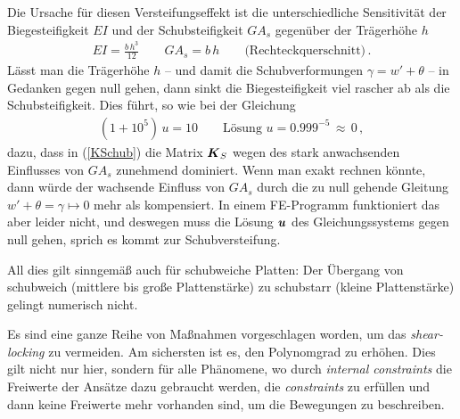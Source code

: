 {Die Ursache f\"{u}r diesen Versteifungseffekt ist die unterschiedliche Sensitivit\"{a}t der Biegesteifigkeit $EI$ und der Schubsteifigkeit $GA_s$ gegen\"{u}ber der Tr\"{a}gerh\"{o}he $h$
\begin{align}
E I = \frac{b\,h^3}{12} \qquad G A_s = b \, h   \qquad \mbox{(Rechteckquerschnitt)} \,.
\end{align}
L\"{a}sst man die Tr\"{a}gerh\"{o}he $h$ -- und damit die Schubverformungen $\gamma = w' + \theta$ -- in Gedanken gegen null gehen, dann sinkt die Biegesteifigkeit viel rascher ab als die Schubsteifigkeit. Dies f\"{u}hrt, so wie bei der Gleichung
\begin{align}
(1 + 10^5)\, u = 10  \qquad \mbox{L\"{o}sung $u = 0.999^{-5}\, \approx \, 0$}\,,
\end{align}
dazu, dass in (\ref{KSchub}) die Matrix $\mbox{\boldmath $K$}_S$ wegen des stark anwachsenden Einflusses von $GA_s$ zunehmend dominiert. Wenn man exakt rechnen k\"{o}nnte, dann w\"{u}rde der wachsende Einfluss von $GA_s$ durch die zu null gehende Gleitung $w' + \theta = \gamma \mapsto 0$ mehr als kompensiert. In einem FE-Programm funktioniert das aber leider nicht, und deswegen muss die L\"{o}sung $\mbox{\boldmath $u$}$ des Gleichungssystems gegen null gehen, sprich es kommt zur Schubversteifung.

All dies gilt sinngem\"{a}{\ss} auch f\"{u}r schubweiche Platten: Der \"{U}bergang von schubweich (mittlere bis gro{\ss}e Plattenst\"{a}rke) zu schubstarr (kleine Plattenst\"{a}rke) gelingt numerisch nicht.\\ } %

Es sind eine ganze Reihe von Ma{\ss}nahmen vorgeschlagen worden, um das {\em shear-locking } zu vermeiden. Am sichersten ist es, den Polynomgrad zu erh\"{o}hen. Dies gilt nicht nur hier, sondern f\"{u}r alle Ph\"{a}nomene, wo durch {\em internal constraints\/} die Freiwerte der Ans\"{a}tze dazu gebraucht werden, die {\em constraints\/} zu erf\"{u}llen und dann keine Freiwerte mehr vorhanden sind, um die Bewegungen zu beschreiben.

